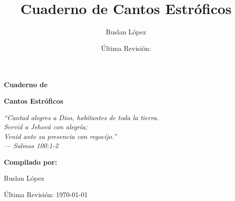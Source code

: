 \documentclass[12pt, spanish]{book}
\title{Cuaderno de Cantos Estr\'oficos}
\author{Ruslan L\'opez}
\date{\'Ultima Revisi\'on:  \RevDate}
\newcommand{\RevDate}{\today}
\begin{document}
    \hypersetup{pageanchor=false}

    \begin{titlepage}
        \centering

        \vspace*{1cm}

        {\Huge\bfseries\sffamily{$\dagger$}\par}

        \vspace{1.5cm}

        {\Huge\bfseries\sffamily Cuaderno de\par}
        \vspace{0.5cm}
        {\Huge\bfseries\sffamily Cantos Estróficos\par}

        \vspace{2cm}

        \begin{center}
            \Large\itshape ``Cantad alegres a Dios, habitantes de toda la tierra.\\
            Servid a Jehov\'a con alegr\'ia;\\
            Venid ante su presencia con regocijo.''\\
            \vspace{0.3cm}
            --- Salmos 100:1-2
        \end{center}

        \vspace{2cm}

        {\Large\bfseries Compilado por:\par}
        \vspace{0.5cm}
        {\Large Ruslan L\'opez\par}

        \vfill

        {\large \'Ultima Revisi\'on: \RevDate\par}

        \vspace{1cm}

    \end{titlepage}

    \hypersetup{pageanchor=true}
    \ifWordBk
    \twocolumn
    \fi
\end{document}
